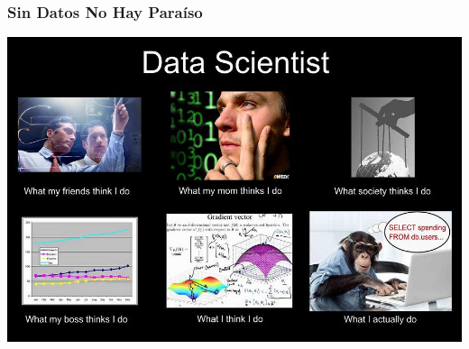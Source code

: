 \documentclass[leqno, 10pt, envcountsect]{beamer}
\numberwithin{equation}{section}
\theoremstyle{definition}
\theoremstyle{example}
\numberwithin{figure}{section}
\numberwithin{table}{section}
\begin{document}
\begin{frame}
  \frametitle{Sin Datos No Hay Paraíso}
  \begin{center}
    \includegraphics[scale=0.35]{whatido.jpg}
  \end{center}
\end{frame}
\end{document}
